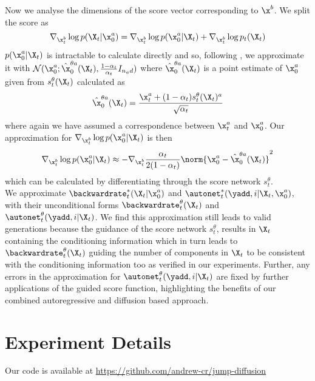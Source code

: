 Now we analyse the dimensions of the score vector corresponding to $\x^b$. We split the score as
\begin{equation}
    \nabla_{\x_t^b} \log p(\X_t | \x_0^a) = \nabla_{\x_t^b} \log p(\x_0^a | \X_t) + \nabla_{\x_t^b} \log p_t(\X_t)
    \label{eq:condScoreSplit}
\end{equation}
$p(\x_0^a | \X_t)$ is intractable to calculate directly and so, following \cite{ho2022video}, we approximate it with $\mathcal{N}(\x_0^a ; \hat{\x}_0^{\theta a}(\X_t), \frac{1 - \alpha_t}{\alpha_t} I_{n_a d})$ where $\hat{\x}_0^{\theta a}(\X_t)$ is a point estimate of $\x_0^a$ given from $s_t^\theta(\X_t)$ calculated as 
\begin{equation}
    \hat{\x}_0^{\theta a}(\X_t) = \frac{\x_t^a + (1 - \alpha_t) s_t^\theta(\X_t)^a}{\sqrt{\alpha_t}}
\end{equation}
where again we have assumed a correspondence between $\x_t^a$ and $\x_0^a$. Our approximation for $\nabla_{\x_t^b} \log p(\x_0^a | \X_t)$ is then
\begin{equation}
    \nabla_{\x_t^b} \log p(\x_0^a | \X_t) \approx - \nabla_{\x_t^b} \frac{\alpha_t}{2 ( 1- \alpha_t)} \norm{\x_0^a - \hat{\x}_0^{\theta a}(\X_t) }^2
\end{equation}
which can be calculated by differentiating through the score network $s_t^\theta$. \\

We approximate $\backwardrate_t^*(\X_t | \x_0^a)$ and $\autonet_t^*(\yadd, i | \X_t, \x_0^a)$, with their unconditional forms $\backwardrate_t^\theta(\X_t)$ and $\autonet_t^\theta(\yadd, i | \X_t)$. We find this approximation still leads to valid generations because the guidance of the score network $s_t^\theta$, results in $\X_t$ containing the conditioning information which in turn leads to $\backwardrate_t^\theta(\X_t)$ guiding the number of components in $\X_t$ to be consistent with the conditioning information too as verified in our experiments. Further, any errors in the approximation for $\autonet_t^\theta(\yadd, i | \X_t)$ are fixed by further applications of the guided score function, highlighting the benefits of our combined autoregressive and diffusion based approach.







\section{Experiment Details}
\label{sec:tddm-ExperimentDetails}
Our code is available at \url{https://github.com/andrew-cr/jump-diffusion}

